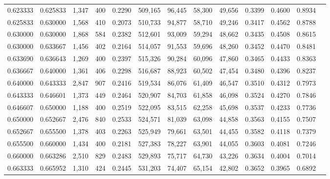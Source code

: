 \begin{tabular}{rrrrrrrrrrrrr}
0.623333 & 0.625833 &  1,347 &   400 &                                     0.2290 & 509,165 &  96,445 &  58,300 &  49,656 & 0.3399 & 0.4600 & 0.8934 \\
0.625833 & 0.630000 &  1,568 &   410 &                                     0.2073 & 510,733 &  94,877 &  58,710 &  49,246 & 0.3417 & 0.4562 & 0.8788 \\
0.630000 & 0.630000 &  1,868 &   584 &                                     0.2382 & 512,601 &  93,009 &  59,294 &  48,662 & 0.3435 & 0.4508 & 0.8615 \\
0.630000 & 0.633667 &  1,456 &   402 &                                     0.2164 & 514,057 &  91,553 &  59,696 &  48,260 & 0.3452 & 0.4470 & 0.8481 \\
0.633690 & 0.636643 &  1,269 &   400 &                                     0.2397 & 515,326 &  90,284 &  60,096 &  47,860 & 0.3465 & 0.4433 & 0.8363 \\
0.636667 & 0.640000 &  1,361 &   406 &                                     0.2298 & 516,687 &  88,923 &  60,502 &  47,454 & 0.3480 & 0.4396 & 0.8237 \\
0.640000 & 0.643333 &  2,847 &   907 &                                     0.2416 & 519,534 &  86,076 &  61,409 &  46,547 & 0.3510 & 0.4312 & 0.7973 \\
0.643333 & 0.646601 &  1,373 &   449 &                                     0.2464 & 520,907 &  84,703 &  61,858 &  46,098 & 0.3524 & 0.4270 & 0.7846 \\
0.646607 & 0.650000 &  1,188 &   400 &                                     0.2519 & 522,095 &  83,515 &  62,258 &  45,698 & 0.3537 & 0.4233 & 0.7736 \\
0.650000 & 0.652667 &  2,476 &   840 &                                     0.2533 & 524,571 &  81,039 &  63,098 &  44,858 & 0.3563 & 0.4155 & 0.7507 \\
0.652667 & 0.655500 &  1,378 &   403 &                                     0.2263 & 525,949 &  79,661 &  63,501 &  44,455 & 0.3582 & 0.4118 & 0.7379 \\
0.655500 & 0.660000 &  1,434 &   400 &                                     0.2181 & 527,383 &  78,227 &  63,901 &  44,055 & 0.3603 & 0.4081 & 0.7246 \\
0.660000 & 0.663286 &  2,510 &   829 &                                     0.2483 & 529,893 &  75,717 &  64,730 &  43,226 & 0.3634 & 0.4004 & 0.7014 \\
0.663333 & 0.665952 &  1,310 &   424 &                                     0.2445 & 531,203 &  74,407 &  65,154 &  42,802 & 0.3652 & 0.3965 & 0.6892 \\

\end{tabular}
